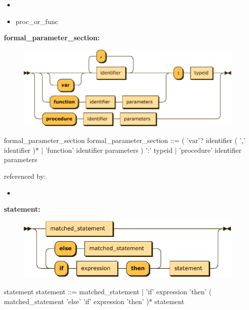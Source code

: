 \documentclass[10pt,a4paper,twoside]{article}
\providecommand{\tightlist}{%
  \setlength{\itemsep}{0pt}\setlength{\parskip}{0pt}}
\newcounter{grammarbox}[section]
\begin{document}
\begin{itemize}
\tightlist
\item
\item
  proc\_or\_func
\end{itemize}

\textbf{formal\_parameter\_section:}

\begin{figure}[H]
\centering
\includegraphics{diagram/formal_parameter_section.pdf}

\end{figure}

\begin{grammarbox}{formal\_parameter\_section}
\vspace{0.5em}
formal\_parameter\_section
         ::= ( 'var'? identifier ( ',' identifier )* | 'function' identifier parameters ) ':' typeid
           | 'procedure' identifier parameters
\end{grammarbox}

referenced by:

\begin{itemize}
\tightlist
\item
\end{itemize}

\textbf{statement:}

\begin{figure}[H]
\centering
\includegraphics{diagram/statement.pdf}

\end{figure}

\begin{grammarbox}{statement}
\vspace{0.5em}
statement
         ::= matched\_statement
           | 'if' expression 'then' ( matched\_statement 'else' 'if' expression 'then' )* statement
\end{grammarbox}
\end{document}
